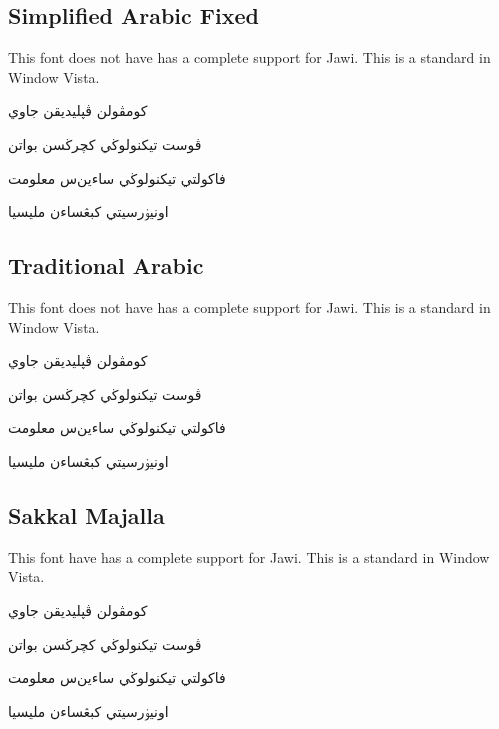 \documentclass[12pt,a4paper]{IEEEconf}
\begin{document}
\subsection{Simplified Arabic Fixed}
This font does not have has a complete support for Jawi. This is a standard in Window Vista.
\newfontfamily{}

\begin{arab}
\begin{center}
کومڤولن ڤڽليديقن جاوي
\par  
ڤوست تيكنولوڬي کچرڬسن بواتن
\par  
فاکولتي تيكنولوڬي ساءين‌س معلومت
\par  
اونيۏرسيتي کبڠساءن مليسيا
\par  
\end{center}
\end{arab}

\subsection{Traditional Arabic}
This font does not have has a complete support for Jawi. This is a standard in Window Vista.
\newfontfamily{}

\begin{arab}
\begin{center}
کومڤولن ڤڽليديقن جاوي
\par  
ڤوست تيكنولوڬي کچرڬسن بواتن
\par  
فاکولتي تيكنولوڬي ساءين‌س معلومت
\par  
اونيۏرسيتي کبڠساءن مليسيا
\par  
\end{center}
\end{arab}


\subsection{Sakkal Majalla}
This font have has a complete support for Jawi. This is a standard in Window Vista.
\newfontfamily{}

\begin{arab}
\begin{center}
کومڤولن ڤڽليديقن جاوي
\par  
ڤوست تيكنولوڬي کچرڬسن بواتن
\par  
فاکولتي تيكنولوڬي ساءين‌س معلومت
\par  
اونيۏرسيتي کبڠساءن مليسيا
\par  
\end{center}
\end{arab}
\end{document}
